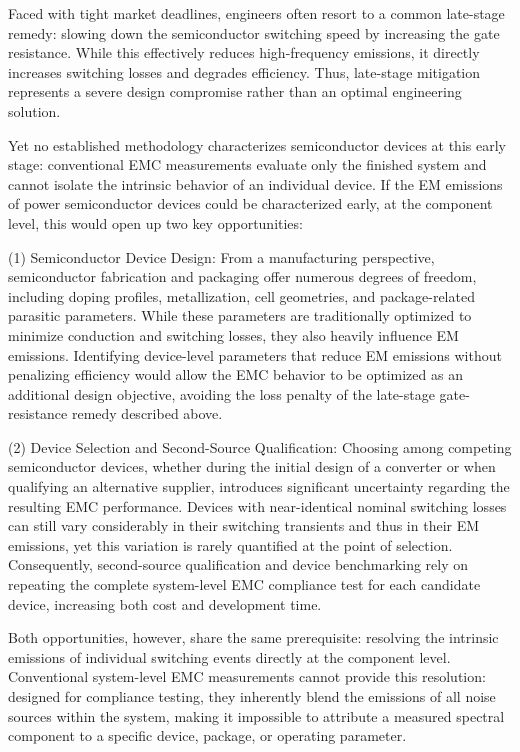 Faced with tight market deadlines, engineers often resort to a common late-stage remedy: slowing down the semiconductor switching speed by increasing the gate resistance. 
While this effectively reduces high-frequency emissions, it directly increases switching losses and degrades efficiency. 
Thus, late-stage mitigation represents a severe design compromise rather than an optimal engineering solution.

Yet no established methodology characterizes semiconductor devices at this early stage: conventional EMC measurements evaluate only the finished system and cannot isolate the intrinsic behavior of an individual device. If the EM emissions of power semiconductor devices could be characterized early, at the component level, this would open up two key opportunities:

(1) Semiconductor Device Design: 
From a manufacturing perspective, semiconductor fabrication and packaging offer numerous degrees of freedom, including doping profiles, metallization, cell geometries, and package-related parasitic parameters. 
While these parameters are traditionally optimized to minimize conduction and switching losses, they also heavily influence EM emissions. 
Identifying device-level parameters that reduce EM emissions without penalizing efficiency would allow the EMC behavior to be optimized as an additional design objective, avoiding the loss penalty of the late-stage gate-resistance remedy described above.

(2) Device Selection and Second-Source Qualification: 
Choosing among competing semiconductor devices, whether during the initial design of a converter or when qualifying an alternative supplier, introduces significant uncertainty regarding the resulting EMC performance.
Devices with near-identical nominal switching losses can still vary considerably in their switching transients and thus in their EM emissions, yet this variation is rarely quantified at the point of selection.
Consequently, second-source qualification and device benchmarking rely on repeating the complete system-level EMC compliance test for each candidate device, increasing both cost and development time.

Both opportunities, however, share the same prerequisite: resolving the intrinsic emissions of individual switching events directly at the component level.
Conventional system-level EMC measurements cannot provide this resolution: designed for compliance testing, they inherently blend the emissions of all noise sources within the system, making it impossible to attribute a measured spectral component to a specific device, package, or operating parameter.

